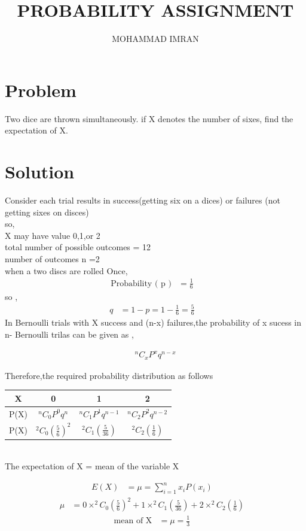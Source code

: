 \documentclass[journal,12pt,two column]{article}
\title{PROBABILITY ASSIGNMENT}
\author{MOHAMMAD IMRAN}
\begin{document}
\maketitle
\bigskip


 \section{Problem }
  Two dice are thrown simultaneously. if X denotes the number of sixes, find the
expectation of X.

\section{Solution }
Consider each trial results in success(getting six on a dices) or failures (not getting sixes on disces)\\
so,\\
X may have value 0,1,or 2\\
total number of possible outcomes = 12\\
number of outcomes n =2\\
when a  two discs are rolled Once,\\

\begin{align}
\text{Probability ( p )} &=
\frac{1}{6}&
 \end{align}
 so ,
 \begin{align}
  q &= 1-p = 1-\frac{1}{6} = \frac{5}{6}&
 \end{align}
 In Bernoulli trials with X success and (n-x) failures,the probability of x sucess in n- Bernoulli trilas can be given as ,
 
\begin{align}
 &^nC_xP^xq^{n-x}&
\end{align}

Therefore,the required probability distribution as follows\\

 \begin{tabular}{ |c |c |c |c |}
 \hline
 X  &  0  &  1  &  2\\
 \hline
 
 P(X)  &  $^nC_0P^0q^n$  &  $^nC_1P^1q^{n-1}$  &  $^nC_2P^2q^{n-2}$\\
 \hline
 
 P(X)  &   $^2C_0(\frac{5}{6})^2$ &  $^2C_1(\frac{5}{36})$ &   $^2C_2(\frac{1}{6})$ \\
 \hline
 
 \end{tabular}\\
 
 
 The expectation of X = mean of the variable X 
 
 \begin{align}
  E(X)&=\mu=\sum_{i=1}^{n} x_i P(x_i)&
\end{align}
\begin{align}
\mu&=0\times^2C_0(\frac{5}{6})^2+1\times^2C_1(\frac{5}{36})+2\times^2C_2(\frac{1}{6})&
\end{align}
\begin{align}
 \text{mean of X}&=\mu=\frac{1}{3}&
 \end{align}
 
 
\end{document}
